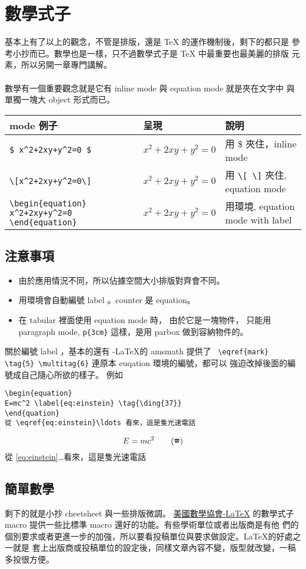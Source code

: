 \chapter{數學式子}
基本上有了以上的觀念，不管是排版，還是 {\TeX} 的運作機制後，剩下的都只是
參考小抄而已。數學也是一樣，只不過數學式子是 {\TeX} 中最重要也最美麗的排版
元素，所以另開一章專門講解。
\\\\
數學有一個重要觀念就是它有 inline mode 與 equation mode 就是夾在文字中
與單獨一塊大 object 形式而已。
\begin{center}
\begin{tabular}{m{3cm}m{4cm}m{3cm}}
mode 例子 & 呈現 & 說明\\
\hline
\verb|$ x^2+2xy+y^2=0 $|&$x^2+2xy+y^2=0 $& 用 \$ 夾住，inline mode\\
\verb|\[x^2+2xy+y^2=0\]|&\[x^2+2xy+y^2=0\]& 用 \verb=\[ \]= 夾住, equation mode\\
\verb|\begin{equation}|
\verb|x^2+2xy+y^2=0|
\verb|\end{equation}|&\begin{equation}x^2+2xy+y^2=0\end{equation}&
	 用環境, equation mode with label \\
\end{tabular}
\end{center}

\section{注意事項}
\begin{itemize}
\item 由於應用情況不同，所以佔據空間大小排版對齊會不同。
\item 用環境會自動編號 label 。counter 是 equation。
\item 在 tabular 裡面使用 equation mode 時， 由於它是一塊物件，
      只能用 paragraph mode, \verb|p{3cm}| 這樣，是用 parbox 做到容納物件的。
\end{itemize}
關於編號 label ，基本的還有 \AmS-\LaTeX 的 amsmath 提供了 
\verb| \eqref{mark} \tag{5} \multitag{6}| 連原本 euqation 環境的編號，都可以
強迫改掉後面的編號成自己隨心所欲的樣子。 例如
\begin{verbatim}
\begin{equation}
E=mc^2 \label{eq:einstein} \tag{\ding{37}}
\end{quation}
從 \eqref{eq:einstein}\ldots 看來，這是隻光速電話
\end{verbatim}
\begin{equation}
E=mc^2 \label{eq:einstein} \tag{\ding{37}}
\end{equation}
從 \eqref{eq:einstein}\ldots 看來，這是隻光速電話

\section{簡單數學}
剩下的就是小抄 cheetsheet 與一些排版微調。
\href{https://www.ams.org/arc/tex/amsmath/amsldoc.pdf}{美國數學協會\AmS-\LaTeX}
的數學式子 macro 提供一些比標準 macro 還好的功能。有些學術單位或者出版商是有他
們的個別要求或者更進一步的加強，所以要看投稿單位與要求做設定。\LaTeX 的好處之一就是
套上出版商或投稿單位的設定後，同樣文章內容不變，版型就改變，一稿多投很方便。
